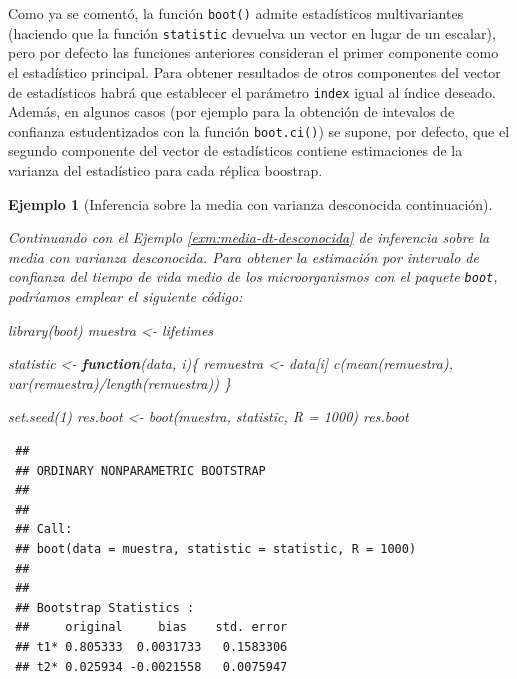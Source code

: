 \documentclass[
  10pt,
]{book}
\newenvironment{Shaded}{\begin{snugshade}}{\end{snugshade}}
\newcommand{\AttributeTok}[1]{\textcolor[rgb]{0.77,0.63,0.00}{#1}}
\newcommand{\ControlFlowTok}[1]{\textcolor[rgb]{0.13,0.29,0.53}{\textbf{#1}}}
\newcommand{\DecValTok}[1]{\textcolor[rgb]{0.00,0.00,0.81}{#1}}
\newcommand{\FunctionTok}[1]{\textcolor[rgb]{0.00,0.00,0.00}{#1}}
\newcommand{\NormalTok}[1]{#1}
\newcommand{\OtherTok}[1]{\textcolor[rgb]{0.56,0.35,0.01}{#1}}
\newcommand{\SpecialCharTok}[1]{\textcolor[rgb]{0.00,0.00,0.00}{#1}}
\theoremstyle{break}
\newtheorem{example}{Ejemplo}[chapter]
\theoremstyle{nonumberplain}
\begin{document}
Como ya se comentó, la función \texttt{boot()} admite estadísticos multivariantes
(haciendo que la función \texttt{statistic} devuelva un vector en lugar de un escalar),
pero por defecto las funciones anteriores consideran el primer componente
como el estadístico principal.
Para obtener resultados de otros componentes del vector de estadísticos
habrá que establecer el parámetro \texttt{index} igual al índice deseado.
Además, en algunos casos (por ejemplo para la obtención de intevalos de confianza
estudentizados con la función \texttt{boot.ci()}) se supone, por defecto, que el segundo
componente del vector de estadísticos contiene estimaciones de la varianza del
estadístico para cada réplica boostrap.

\begin{example}[Inferencia sobre la media con varianza desconocida continuación]
\protect\hypertarget{exm:media-dt-desconocida-boot}{}\label{exm:media-dt-desconocida-boot}

Continuando con el Ejemplo \ref{exm:media-dt-desconocida} de
inferencia sobre la media con varianza desconocida.
Para obtener la estimación por intervalo de confianza del tiempo de vida medio
de los microorganismos con el paquete \texttt{boot}, podríamos emplear
el siguiente código:

\begin{Shaded}
\begin{Highlighting}[]
\FunctionTok{library}\NormalTok{(boot)}
\NormalTok{muestra }\OtherTok{\textless{}{-}}\NormalTok{ lifetimes}

\NormalTok{statistic }\OtherTok{\textless{}{-}} \ControlFlowTok{function}\NormalTok{(data, i)\{}
\NormalTok{  remuestra }\OtherTok{\textless{}{-}}\NormalTok{ data[i]}
  \FunctionTok{c}\NormalTok{(}\FunctionTok{mean}\NormalTok{(remuestra), }\FunctionTok{var}\NormalTok{(remuestra)}\SpecialCharTok{/}\FunctionTok{length}\NormalTok{(remuestra))}
\NormalTok{\}}

\FunctionTok{set.seed}\NormalTok{(}\DecValTok{1}\NormalTok{)}
\NormalTok{res.boot }\OtherTok{\textless{}{-}} \FunctionTok{boot}\NormalTok{(muestra, statistic, }\AttributeTok{R =} \DecValTok{1000}\NormalTok{)}
\NormalTok{res.boot}
\end{Highlighting}
\end{Shaded}

\begin{verbatim}
 ## 
 ## ORDINARY NONPARAMETRIC BOOTSTRAP
 ## 
 ## 
 ## Call:
 ## boot(data = muestra, statistic = statistic, R = 1000)
 ## 
 ## 
 ## Bootstrap Statistics :
 ##     original     bias    std. error
 ## t1* 0.805333  0.0031733   0.1583306
 ## t2* 0.025934 -0.0021558   0.0075947
\end{verbatim}


\end{example}
\end{document}
